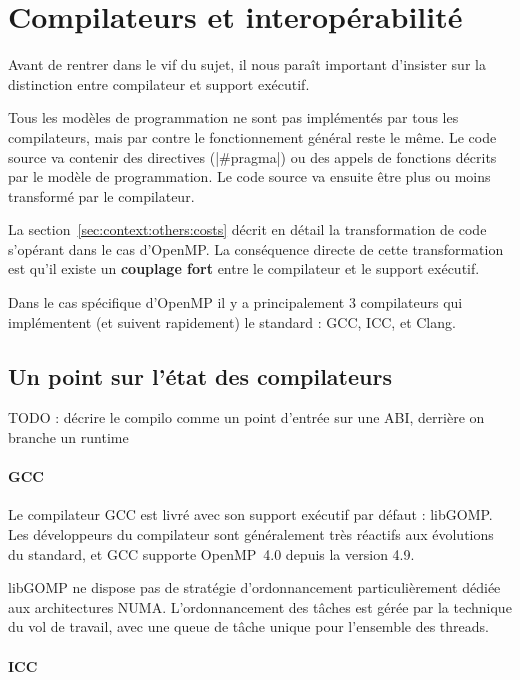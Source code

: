 \section{Compilateurs et interopérabilité}\label{sec:rw:compilers}


Avant de rentrer dans le vif du sujet, il nous paraît important d'insister sur la distinction entre compilateur et support exécutif.

Tous les modèles de programmation ne sont pas implémentés par tous les compilateurs, mais par contre le fonctionnement général reste le même.
Le code source va contenir des directives (|#pragma|) ou des appels de fonctions décrits par le modèle de programmation. Le code source va ensuite être plus ou moins transformé par le compilateur.

La section~\ref{sec:context:others:costs} décrit en détail la transformation de code s'opérant dans le cas d'OpenMP.
La conséquence directe de cette transformation est qu'il existe un \textbf{couplage fort} entre le compilateur et le support exécutif.

Dans le cas spécifique d'OpenMP il y a principalement 3 compilateurs qui implémentent (et suivent rapidement) le standard : GCC, ICC, et Clang.

\subsection{Un point sur l'état des compilateurs}

TODO : décrire le compilo comme un point d'entrée sur une ABI, derrière on branche un runtime

\paragraph{GCC}

Le compilateur GCC est livré avec son support exécutif par défaut : libGOMP.
Les développeurs du compilateur sont généralement très réactifs aux évolutions du standard, et GCC supporte OpenMP~4.0 depuis la version 4.9.

libGOMP ne dispose pas de stratégie d'ordonnancement particulièrement dédiée aux architectures NUMA.
L'ordonnancement des tâches est gérée par la technique du vol de travail, avec une queue de tâche unique pour l'ensemble des threads.



\paragraph{ICC}


